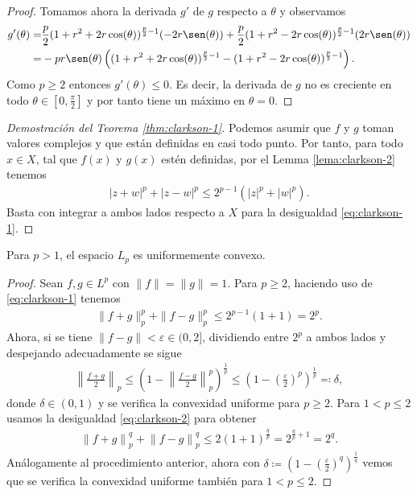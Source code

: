 \begin{proof}
    Tomamos ahora la derivada $g'$ de $ g $ respecto a $ \theta $ y observamos
    \begin{align}
        g'(\theta) = &\frac{p}{2}(1 + r^2 + 2r \cos(\theta))^{\frac{p}{2}-1} (-2r \sen(\theta)) + \frac{p}{2}(1 + r^2 - 2r \cos(\theta))^{\frac{p}{2}-1} (2r \sen(\theta)) \\
        = &-pr \sen(\theta) \left((1+r^2 + 2r\cos(\theta))^{\frac{p}{2}-1} - (1+r^2 - 2r\cos(\theta))^{\frac{p}{2}-1}\right).
    \end{align}
    Como $ p \geq 2 $ entonces $g'(\theta) \leq 0 $. Es decir, la derivada de $ g $ no es creciente en todo $ \theta \in \left[0, \frac{\pi}{2}\right] $ y por tanto tiene un máximo en $ \theta = 0 $.
\end{proof}

\begin{proof}[Demostración del Teorema \ref{thm:clarkson-1}]
    Podemos asumir que $ f $ y $ g $ toman valores complejos y que están definidas en casi todo punto. Por tanto, para todo $ x \in X $, tal que $ f(x) $ y $ g(x) $ estén definidas, por el Lemma \ref{lema:clarkson-2} tenemos
    \begin{align}
        \left| z + w \right|^p + \left| z - w \right|^p \leq 2^{p-1} \left( |z|^p + |w|^p \right).
    \end{align}
    Basta con integrar a ambos lados respecto a $ X $ para la desigualdad \eqref{eq:clarkson-1}.
\end{proof}

\begin{corollary}
    Para $ p > 1 $, el espacio $ L_p $ es uniformemente convexo.
\end{corollary}
\begin{proof}
    Sean $ f, g \in L^p $ con $ \|f\| = \|g\| = 1 $. Para $ p \geq 2 $, haciendo uso de \eqref{eq:clarkson-1} tenemos
    \begin{align}
        \| f + g \|_p^p + \| f - g \|_p^p \leq 2^{p-1}(1 + 1) = 2^p.
    \end{align}
    Ahora, si se tiene $\|f-g\| < \varepsilon \in (0, 2] $, dividiendo entre $ 2^p $ a ambos lados y despejando adecuadamente se sigue
    \begin{align}
        \left\| \frac{f + g}{2} \right\|_p \leq \left( 1 - \left\| \frac{f - g}{2} \right\|_p^p\right)^{\frac{1}{p}} \leq \left( 1 - \left( \frac{\varepsilon}{2} \right)^p\right)^{\frac{1}{p}} \eqcolon \delta,
    \end{align}
    donde $ \delta \in (0, 1) $ y se verifica la convexidad uniforme para $ p \geq 2 $. Para $ 1 < p \leq 2 $ usamos la desigualdad \eqref{eq:clarkson-2} para obtener
    \begin{align}
        \left\| f + g \right\|_p^q + \left\| f - g \right\|_p^q \leq 2 \left(1 + 1 \right)^{\frac{q}{p}} = 2^{\frac{q}{p}+1} = 2^q.
    \end{align}
    Análogamente al procedimiento anterior, ahora con $ \delta \coloneq  \left( 1 - \left( \frac{\varepsilon}{2} \right)^q\right)^{\frac{1}{q}} $ vemos que se verifica la convexidad uniforme también para $ 1 < p \leq 2 $.
\end{proof}
